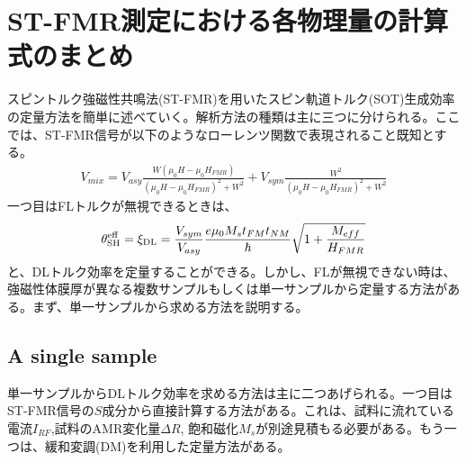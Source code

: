 \documentclass[12pt]{jsbook}
\begin{document}
\chapter{ST-FMR測定における各物理量の計算式のまとめ}
スピントルク強磁性共鳴法(ST-FMR)を用いたスピン軌道トルク(SOT)生成効率の定量方法を簡単に述べていく。解析方法の種類は主に三つに分けられる。ここでは、ST-FMR信号が以下のようなローレンツ関数で表現されること既知とする。
\begin{align}
	V_{mix}=V_{asy}\frac{W(\mu_0H-\mu_0H_{FMR})}{(\mu_0H-\mu_0H_{FMR})^2+W^2}+V_{sym}\frac{W^2}{(\mu_0H-\mu_0H_{FMR})^2+W^2}
\end{align}
一つ目はFLトルクが無視できるときは、
\begin{align}
	\theta_{\rm{SH}}^{\rm{eff}}=\xi_{\rm{DL}}=\frac{V_{sym}}{V_{asy}}\frac{e\mu_0M_st_{FM}t_{NM}}{\hbar}\sqrt{1+\frac{M_{eff}}{H_{FMR}}}
\end{align}
と、DLトルク効率を定量することができる。しかし、FLが無視できない時は、強磁性体膜厚が異なる複数サンプルもしくは単一サンプルから定量する方法がある。まず、単一サンプルから求める方法を説明する。
\section{A single sample}
単一サンプルからDLトルク効率を求める方法は主に二つあげられる。一つ目はST-FMR信号の$S$成分から直接計算する方法がある。これは、試料に流れている電流$I_{RF}$,試料のAMR変化量$\Delta R$, 飽和磁化$M_s$が別途見積もる必要がある。もう一つは、緩和変調(DM)を利用した定量方法がある。
\end{document}
